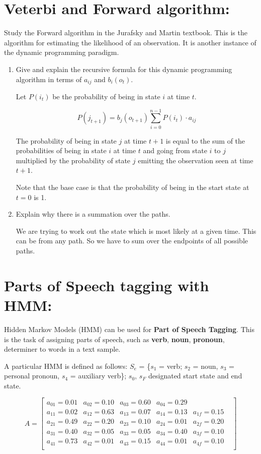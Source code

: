 \documentclass[10pt,\jkfside,a4paper]{article}
\begin{document}
\section*{Veterbi and Forward algorithm:}

Study the Forward algorithm in the Jurafsky and Martin textbook. This is the
algorithm for estimating the likelihood of an observation. It is another instance
of the dynamic programming paradigm.

\begin{enumerate}

\item Give and explain the recursive formula for this dynamic programming
algorithm in terms of $a_{ij}$ and $b_i(o_t)$.

Let $P(i_t)$ be the probability of being in state $i$ at time $t$.

\[
P(j_{t+1}) = b_j(o_{t+1}) \sum^{n-1}_{i=0} P(i_t) \cdot a_{ij}
\]

The probability of being in state $j$ at time $t + 1$ is equal to the sum of the 
probabilities of being in state $i$ at time $t$ and going from state $i$ to $j$ multiplied 
by the probability of state $j$ emitting the observation seen at time $t + 1$.

Note that the base case is that the probability of being in the start state at $t=0$ is 1.

\item Explain why there is a summation over the paths.

We are trying to work out the state which is most likely at a given time. This can 
be from any path. So we have to sum over the endpoints of all possible paths.

\end{enumerate}

\section*{Parts of Speech tagging with HMM:}

Hidden Markov Models (HMM) can be used for \textbf{Part of Speech Tagging}.
This is the task of assigning parts of speech, such as \textbf{verb}, 
\textbf{noun}, \textbf{pronoun}, determiner to words in a text sample.

A particular HMM is defined as follows: $S_e$ = \{$s_1$ = verb; $s_2$ = noun, $s_3$ =
personal pronoun, $s_4$ = auxiliary verb\}; $s_0$, $s_F$ designated start state and end
state.

\[A = 
\begin{bmatrix}
a_{01} = 0.01 & a_{02} = 0.10 & a_{03} = 0.60 & a_{04} = 0.29 & & \\
a_{11} = 0.02 & a_{12} = 0.63 & a_{13} = 0.07 & a_{14} = 0.13 & a_{1f} = 0.15 \\
a_{21} = 0.49 & a_{22} = 0.20 & a_{23} = 0.10 & a_{24} = 0.01 & a_{2f} = 0.20 \\
a_{31} = 0.40 & a_{32} = 0.05 & a_{33} = 0.05 & a_{34} = 0.40 & a_{3f} = 0.10 \\
a_{41} = 0.73 & a_{42} = 0.01 & a_{43} = 0.15 & a_{44} = 0.01 & a_{4f} = 0.10 \\
\end{bmatrix}
\]
\end{document}
